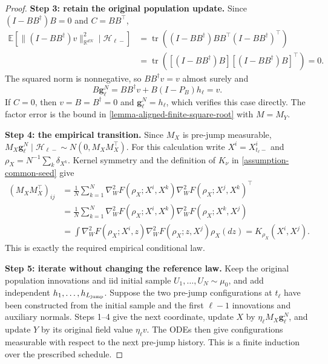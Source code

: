 \begin{proof}
\par\noindent\textbf{Step 3: retain the original population update.}
Since $(I-BB^\dagger)B=0$ and $C=BB^\top$,
\[
 \begin{aligned}
 \mathbb E[\|(I-BB^\dagger)v\|_{\mathbb R^{dN}}^2\mid\mathcal H_{\ell-}]
 &=\operatorname{tr}((I-BB^\dagger)BB^\top(I-BB^\dagger)^\top)\\
 &=\operatorname{tr}([(I-BB^\dagger)B][(I-BB^\dagger)B]^\top)=0.
\end{aligned}
\]
The squared norm is nonnegative, so $BB^\dagger v=v$ almost surely and
\[
 B\mathbf g_\ell^N=BB^\dagger v+B(I-P_B)h_\ell=v.
\]
If $C=0$, then $v=B=B^\dagger=0$ and $\mathbf g_\ell^N=h_\ell$,
which verifies this case directly. The factor error is the bound in
\cref{lemma-aligned-finite-square-root} with $M=M_Y$.

\par\noindent\textbf{Step 4: the empirical transition.}
Since $M_X$ is pre-jump measurable,
$M_X\mathbf g_\ell^N\mid\mathcal H_{\ell-}\sim N(0,M_XM_X^\top)$.
For this calculation write $X^i=X_{t_\ell-}^i$ and
$\rho_X=N^{-1}\sum_k\delta_{X^k}$. Kernel symmetry and the definition of
$K_\nu$ in \cref{assumption-common-seed} give
\[
\begin{aligned}
 (M_XM_X^\top)_{ij}
 &=\frac1N\sum_{k=1}^N
 \nabla_W^2F(\rho_X;X^i,X^k)
 \nabla_W^2F(\rho_X;X^j,X^k)^\top\\
 &=\frac1N\sum_{k=1}^N
 \nabla_W^2F(\rho_X;X^i,X^k)
 \nabla_W^2F(\rho_X;X^k,X^j)\\
 &=\int\nabla_W^2F(\rho_X;X^i,z)\nabla_W^2F(\rho_X;z,X^j)\rho_X(dz)
 =K_{\rho_X}(X^i,X^j).
\end{aligned}
\]
This is exactly the required empirical conditional law.

\par\noindent\textbf{Step 5: iterate without changing the reference law.}
Keep the original population innovations and iid initial sample
$U_1,\ldots,U_N\sim\mu_0$, and add independent
$h_1,\ldots,h_{L_{\mathrm{jump}}}$. Suppose the two pre-jump configurations at
$t_\ell$ have been constructed from the initial sample and the first
$\ell-1$ innovations and auxiliary normals. Steps 1--4 give the next
coordinate, update $X$ by $\eta_\ell M_X\mathbf g_\ell^N$, and update
$Y$ by its original field value $\eta_\ell v$. The ODEs then give
configurations measurable with respect to the next pre-jump history.
This is a finite induction over the prescribed schedule.


\end{proof}
